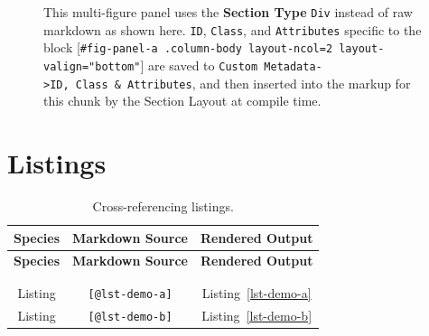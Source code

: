 \documentclass[
  10pt,
  oneside,
  cleardoublepage=empty,
  numbers=noenddot,
  titlepage,
  toclink=all,
  toc=bibliography,
  headinclude,
  footinclude]{scrbook}
\theoremstyle{plain}
\theoremstyle{plain}
\theoremstyle{definition}
\theoremstyle{definition}
\theoremstyle{plain}
\theoremstyle{plain}
\theoremstyle{definition}
\theoremstyle{plain}
\theoremstyle{remark}
\begin{document}
\begin{figure}
\begin{minipage}{0.50\linewidth}
{}


\end{minipage}%

\caption{\label{fig-panel-a}This multi-figure panel uses the
\textbf{Section Type} \texttt{Div} instead of raw markdown as shown
here. \texttt{ID}, \texttt{Class}, and \texttt{Attributes} specific to
the block
{[}\texttt{\#fig-panel-a\ .column-body\ layout-ncol=2\ layout-valign="bottom"}{]}
are saved to
\texttt{Custom\ Metadata-\textgreater{}ID,\ Class\ \&\ Attributes}, and
then inserted into the markup for this chunk by the Section Layout at
compile time.}

\end{figure}%

\section{Listings}\label{listings}

\begin{longtable}[]{@{}ccc@{}}
\toprule\noalign{}
\textbf{Species} & \textbf{Markdown Source} & \textbf{Rendered
Output} \\
\midrule\noalign{}
\endfirsthead
\toprule\noalign{}
\textbf{Species} & \textbf{Markdown Source} & \textbf{Rendered
Output} \\
\midrule\noalign{}
\endhead
\bottomrule\noalign{}
\tabularnewline
\caption{Cross-referencing listings.}\label{tbl-listings}\tabularnewline
\endlastfoot
Listing & \texttt{{[}@lst-demo-a{]}} &
\label{cite_56}{\label{cite_56}Listing~\ref{lst-demo-a}} \\
Listing & \texttt{{[}@lst-demo-b{]}} &
\label{cite_57}{\label{cite_57}Listing~\ref{lst-demo-b}} \\
\end{longtable}
\end{document}
